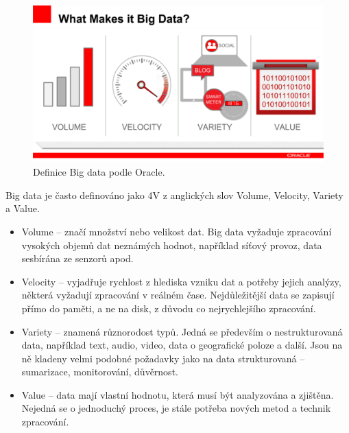 \begin{figure}[!h]
  \centering
  \includegraphics[width=12.5cm]{template-fig/what_makes_data_big_data.pdf}
  \caption{Definice Big data podle Oracle. \cite{johanBigData}}
  \label{FIG_BigData}
\end{figure}

\noindent Big data je často definováno jako 4V z anglických slov Volume, Velocity, Variety a Value. \cite{oracleBigData}

\begin{itemize}
\item Volume – značí množství nebo velikost dat. Big data vyžaduje zpracování vysokých objemů dat neznámých hodnot, například síťový provoz, data sesbírána ze senzorů apod.

\item Velocity – vyjadřuje rychlost z hlediska vzniku dat a potřeby jejich analýzy, některá vyžadují zpracování v reálném čase. Nejdůležitější data se zapisují přímo do paměti, a ne na disk, z důvodu co nejrychlejšího zpracování.

\item Variety – znamená různorodost typů. Jedná se především o nestrukturovaná data, například text, audio, video, data o geografické poloze a další. Jsou na ně kladeny velmi podobné požadavky jako na data strukturovaná – sumarizace, monitorování, důvěrnost. \cite{oracleBigData}

\item Value – data mají vlastní hodnotu, která musí být analyzována a zjištěna. Nejedná se o jednoduchý proces, je stále potřeba nových metod a technik zpracování.
\end{itemize}

